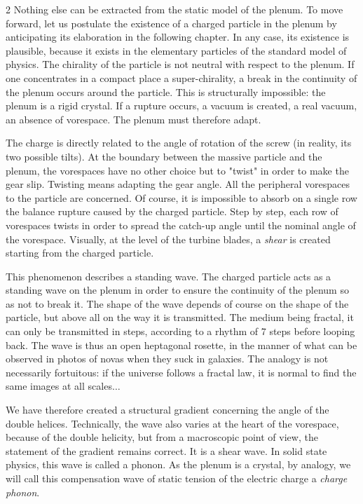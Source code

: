 \begin{multicols}{2}
	Nothing else can be extracted from the static model of the plenum. To 
	move forward, let us postulate the existence of a charged particle in the 
	plenum by anticipating its elaboration in the following chapter. In any 
	case, its existence is plausible, because it exists in the elementary 
	particles of the standard model of physics. The chirality of the 
	particle is not neutral with respect to the plenum. If one concentrates 
	in a compact place a super-chirality, a break in the continuity of the 
	plenum occurs around the particle. This is structurally impossible: the 
	plenum is a rigid crystal. If a rupture occurs, a vacuum is created, a 
	real vacuum, an absence of vorespace. The plenum must therefore adapt.
	
	The charge is directly related to the angle of rotation of the screw (in 
	reality, its two possible tilts). At the boundary between the massive 
	particle and the plenum, the vorespaces have no other choice but to 
	"twist" in order to make the gear slip. Twisting means adapting the gear 
	angle. All the peripheral vorespaces to the particle are concerned. Of 
	course, it is impossible to absorb on a single row the balance rupture 
	caused by the charged particle. Step by step, each row of vorespaces 
	twists in order to spread the catch-up angle until the nominal angle of 
	the vorespace. Visually, at the level of the turbine blades, a 
	\textit{shear} is created starting from the charged particle.
	
	This phenomenon describes a standing wave. The charged particle acts as 
	a standing wave on the plenum in order to ensure the continuity of the 
	plenum so as not to break it. The shape of the wave depends of course on 
	the shape of the particle, but above all on the way it is transmitted. 
	The medium being fractal, it can only be transmitted in steps, according 
	to a rhythm of 7 steps before looping back. The wave is thus an open 
	heptagonal rosette, in the manner of what can be observed in photos of 
	novas when they suck in galaxies. The analogy is not necessarily 
	fortuitous: if the universe follows a fractal law, it is normal to find 
	the same images at all scales$\dots$
	
	We have therefore created a structural gradient concerning the angle of the 
	double helices. Technically, the wave also varies at the heart of the 
	vorespace, because of the double helicity, but from a macroscopic point of 
	view, the statement of the gradient remains correct. It is a shear wave. 
	In solid state physics, this wave is called a phonon. As the plenum is a 
	crystal, by analogy, we will call this compensation wave of static 
	tension of the electric charge a \textit{charge phonon}.
	

\end{multicols}
